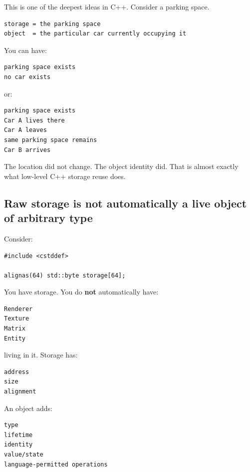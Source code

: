 \hypertarget{05-engine-i-ch002-storage-is-a-place-an-object-is-its-occupant}{}

This is one of the deepest ideas in C++. Consider a parking space.

\begin{verbatim}
storage = the parking space
object  = the particular car currently occupying it
\end{verbatim}

You can have:

\begin{verbatim}
parking space exists
no car exists
\end{verbatim}

or:

\begin{verbatim}
parking space exists
Car A lives there
Car A leaves
same parking space remains
Car B arrives
\end{verbatim}

The location did not change. The object identity did. That is almost exactly what low-level C++ storage reuse does.

\subsection{Raw storage is not automatically a live object of arbitrary type}\label{05-engine-i-ch002-raw-storage-is-not-automatically-a-live-object-of-arbitrary-type}

\hypertarget{05-engine-i-ch002-raw-storage-is-not-automatically-a-live-object-of-arbitrary-type}{}

Consider:

\begin{verbatim}
#include <cstddef>

alignas(64) std::byte storage[64];
\end{verbatim}

You have storage. You do \textbf{not} automatically have:

\begin{verbatim}
Renderer
Texture
Matrix
Entity
\end{verbatim}

living in it. Storage has:

\begin{verbatim}
address
size
alignment
\end{verbatim}

An object adds:

\begin{verbatim}
type
lifetime
identity
value/state
language-permitted operations
\end{verbatim}

